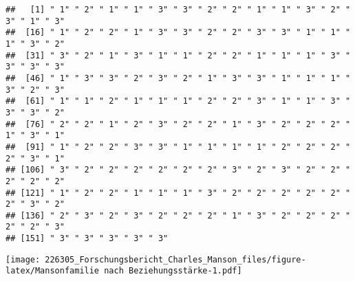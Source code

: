 \documentclass[
]{article}
\newenvironment{Shaded}{\begin{snugshade}}{\end{snugshade}}
\newcommand{\CommentTok}[1]{\textcolor[rgb]{0.56,0.35,0.01}{\textit{#1}}}
\newcommand{\DataTypeTok}[1]{\textcolor[rgb]{0.13,0.29,0.53}{#1}}
\newcommand{\DecValTok}[1]{\textcolor[rgb]{0.00,0.00,0.81}{#1}}
\newcommand{\FloatTok}[1]{\textcolor[rgb]{0.00,0.00,0.81}{#1}}
\newcommand{\KeywordTok}[1]{\textcolor[rgb]{0.13,0.29,0.53}{\textbf{#1}}}
\newcommand{\NormalTok}[1]{#1}
\newcommand{\OperatorTok}[1]{\textcolor[rgb]{0.81,0.36,0.00}{\textbf{#1}}}
\newcommand{\StringTok}[1]{\textcolor[rgb]{0.31,0.60,0.02}{#1}}
\begin{document}
\begin{verbatim}
##   [1] " 1" " 2" " 1" " 1" " 3" " 3" " 2" " 2" " 1" " 1" " 3" " 2" " 3" " 1" " 3"
##  [16] " 1" " 2" " 2" " 1" " 3" " 3" " 2" " 2" " 3" " 3" " 1" " 1" " 1" " 3" " 2"
##  [31] " 3" " 2" " 1" " 3" " 1" " 1" " 2" " 2" " 1" " 1" " 1" " 3" " 3" " 3" " 3"
##  [46] " 1" " 3" " 3" " 2" " 3" " 2" " 1" " 3" " 3" " 1" " 1" " 1" " 3" " 2" " 3"
##  [61] " 1" " 1" " 2" " 1" " 1" " 1" " 2" " 2" " 3" " 1" " 1" " 3" " 3" " 3" " 2"
##  [76] " 2" " 2" " 1" " 2" " 3" " 2" " 2" " 1" " 3" " 2" " 2" " 2" " 1" " 3" " 1"
##  [91] " 1" " 2" " 2" " 3" " 3" " 1" " 1" " 1" " 1" " 2" " 2" " 2" " 2" " 3" " 1"
## [106] " 3" " 2" " 2" " 2" " 2" " 2" " 2" " 3" " 2" " 3" " 2" " 2" " 2" " 2" " 2"
## [121] " 1" " 2" " 2" " 1" " 1" " 1" " 3" " 2" " 2" " 2" " 2" " 2" " 2" " 3" " 2"
## [136] " 2" " 3" " 2" " 3" " 2" " 2" " 2" " 1" " 3" " 2" " 2" " 2" " 2" " 2" " 3"
## [151] " 3" " 3" " 3" " 3" " 3"
\end{verbatim}

\begin{Shaded}
\end{Shaded}

\texttt{[image: 226305\_Forschungsbericht\_Charles\_Manson\_files/figure-latex/Mansonfamilie nach Beziehungsstärke-1.pdf]}

\begin{Shaded}
\end{Shaded}
\end{document}
